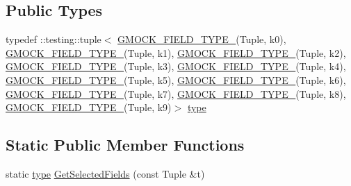 \subsection*{Public Types}
\begin{DoxyCompactItemize}
\item 
typedef \+::testing\+::tuple$<$ \hyperlink{gmock-generated-matchers_8h_acf3e27de83a73f0d873da1cd471e505b}{G\+M\+O\+C\+K\+\_\+\+F\+I\+E\+L\+D\+\_\+\+T\+Y\+P\+E\+\_\+}(Tuple, k0), \hyperlink{gmock-generated-matchers_8h_acf3e27de83a73f0d873da1cd471e505b}{G\+M\+O\+C\+K\+\_\+\+F\+I\+E\+L\+D\+\_\+\+T\+Y\+P\+E\+\_\+}(Tuple, k1), \hyperlink{gmock-generated-matchers_8h_acf3e27de83a73f0d873da1cd471e505b}{G\+M\+O\+C\+K\+\_\+\+F\+I\+E\+L\+D\+\_\+\+T\+Y\+P\+E\+\_\+}(Tuple, k2), \hyperlink{gmock-generated-matchers_8h_acf3e27de83a73f0d873da1cd471e505b}{G\+M\+O\+C\+K\+\_\+\+F\+I\+E\+L\+D\+\_\+\+T\+Y\+P\+E\+\_\+}(Tuple, k3), \hyperlink{gmock-generated-matchers_8h_acf3e27de83a73f0d873da1cd471e505b}{G\+M\+O\+C\+K\+\_\+\+F\+I\+E\+L\+D\+\_\+\+T\+Y\+P\+E\+\_\+}(Tuple, k4), \hyperlink{gmock-generated-matchers_8h_acf3e27de83a73f0d873da1cd471e505b}{G\+M\+O\+C\+K\+\_\+\+F\+I\+E\+L\+D\+\_\+\+T\+Y\+P\+E\+\_\+}(Tuple, k5), \hyperlink{gmock-generated-matchers_8h_acf3e27de83a73f0d873da1cd471e505b}{G\+M\+O\+C\+K\+\_\+\+F\+I\+E\+L\+D\+\_\+\+T\+Y\+P\+E\+\_\+}(Tuple, k6), \hyperlink{gmock-generated-matchers_8h_acf3e27de83a73f0d873da1cd471e505b}{G\+M\+O\+C\+K\+\_\+\+F\+I\+E\+L\+D\+\_\+\+T\+Y\+P\+E\+\_\+}(Tuple, k7), \hyperlink{gmock-generated-matchers_8h_acf3e27de83a73f0d873da1cd471e505b}{G\+M\+O\+C\+K\+\_\+\+F\+I\+E\+L\+D\+\_\+\+T\+Y\+P\+E\+\_\+}(Tuple, k8), \hyperlink{gmock-generated-matchers_8h_acf3e27de83a73f0d873da1cd471e505b}{G\+M\+O\+C\+K\+\_\+\+F\+I\+E\+L\+D\+\_\+\+T\+Y\+P\+E\+\_\+}(Tuple, k9)$>$ \hyperlink{classtesting_1_1internal_1_1TupleFields_a5480877377ebc94bf3a6c6cab5c369bc}{type}
\end{DoxyCompactItemize}
\subsection*{Static Public Member Functions}
\begin{DoxyCompactItemize}
\item 
static \hyperlink{classtesting_1_1internal_1_1TupleFields_a5480877377ebc94bf3a6c6cab5c369bc}{type} \hyperlink{classtesting_1_1internal_1_1TupleFields_a020eefb4630e6dffe8bcadd0a70b1bab}{Get\+Selected\+Fields} (const Tuple \&t)
\end{DoxyCompactItemize}



